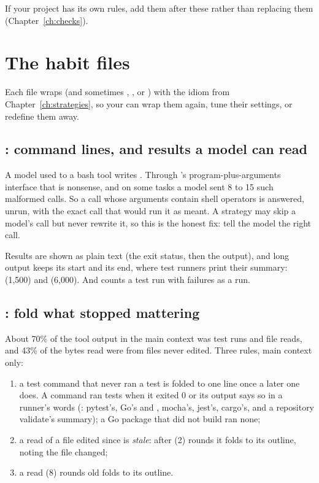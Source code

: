 If your project has its own rules, add them after these rather than
replacing them (Chapter~\ref{ch:checks}).

\section{The habit files}

Each file wraps  (and sometimes ,
,  or ) with the idiom from
Chapter~\ref{ch:strategies}, so your  can wrap them again,
tune their settings, or redefine them away.

\subsection{: command lines, and results a model can read}

A model used to a bash tool writes .
Through 's program-plus-arguments interface that is
nonsense, and on some tasks a model sent 8 to 15 such malformed calls. So
a call whose arguments contain shell operators is answered, unrun, with
the exact  call that would run it as meant. A strategy may
skip a model's call but never rewrite it, so this is the honest fix: tell
the model the right call.

Results are shown as plain text (the exit status, then the output), and
long output keeps its start and its end, where test runners print their
summary:  (1,500) and 
(6,000). And  counts a test run with failures as a run.

\subsection{: fold what stopped mattering}

About 70\% of the tool output in the main context was test runs and file
reads, and 43\% of the bytes read were from files never edited. Three
rules, main context only:

\begin{enumerate}
  \item a test command that never ran a test is folded to one line once a
    later one does. A command ran tests when it exited 0 or its output
    says so in a runner's words (: pytest's, Go's
     and , mocha's, jest's, cargo's, and a
    repository validate's summary); a Go package that did not build ran
    none;
  \item a read of a file edited since is \emph{stale}: after
     (2) rounds it folds to its outline, noting the
    file changed;
  \item a read  (8) rounds old folds to its outline.
\end{enumerate}

